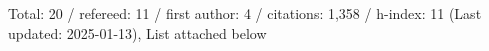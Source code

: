 Total: 20 / refereed: 11 / first author: 4 / citations: 1,358 / h-index: 11 (Last updated: 2025-01-13), List attached below